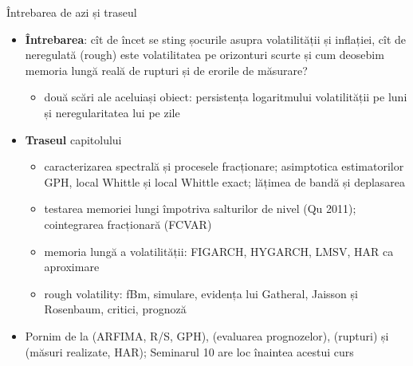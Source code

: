 \begin{frame}{Întrebarea de azi și traseul}
\itemsize{\small}
\begin{itemize}
    \item \textbf{Întrebarea}: cît de încet se sting șocurile asupra volatilității și inflației, cît de neregulată (rough) este volatilitatea pe orizonturi scurte și cum deosebim memoria lungă reală de rupturi și de erorile de măsurare?
    \begin{itemize}
        \item două scări ale aceluiași obiect: persistența logaritmului volatilității pe luni și neregularitatea lui pe zile
    \end{itemize}
    \item \textbf{Traseul} capitolului
    \begin{itemize}
        \item caracterizarea spectrală și procesele fracționare; asimptotica estimatorilor GPH, local Whittle și local Whittle exact; lățimea de bandă și deplasarea
        \item testarea memoriei lungi împotriva salturilor de nivel (Qu 2011); cointegrarea fracționară (FCVAR)
        \item memoria lungă a volatilității: FIGARCH, HYGARCH, LMSV, HAR ca aproximare
        \item rough volatility: fBm, simulare, evidența lui Gatheral, Jaisson și Rosenbaum, critici, prognoză
    \end{itemize}
    \item Pornim de la  (ARFIMA, R/S, GPH),  (evaluarea prognozelor),  (rupturi) și  (măsuri realizate, HAR); Seminarul 10 are loc înaintea acestui curs
\end{itemize}
\end{frame}

